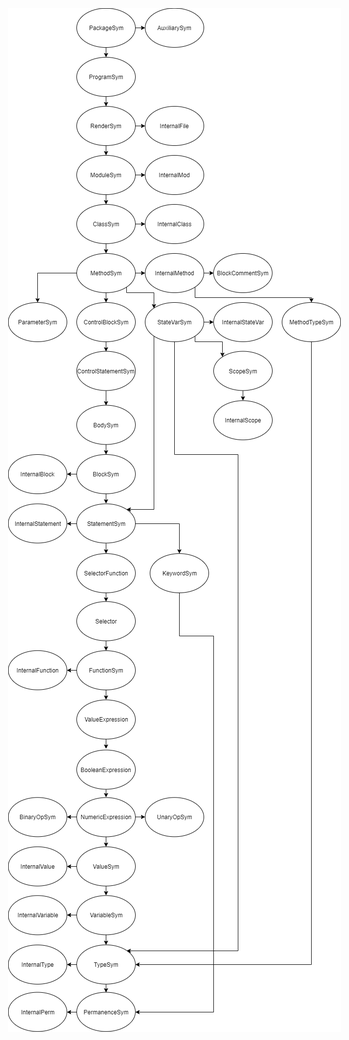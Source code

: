 \documentclass{beamer}
\newcommand{\authornote}[3]{\textcolor{#1}{[#3 ---#2]}}
\newcommand{\bmac}[1]{\authornote{red}{BM}{#1}}
\newcommand{\jc}[1]{\authornote{purple}{JC}{#1}}
\begin{document}
\begin{frame}
\centering
\includegraphics[scale=0.12]{GOOLClasses.png}

\end{frame}
\end{document}
